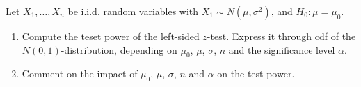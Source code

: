 
\begin{exercise}

Let $X_1, \dots, X_n$ be i.i.d. random variables with $X_1 \sim N(\mu, \sigma^2)$, and $H_0: \mu = \mu_0$.

\begin{enumerate}[label = (\alph*)]

    \item Compute the teset power of the left-sided $z$-test.
    Express it through cdf of the $N(0, 1)$-distribution, depending on $\mu_0$, $\mu$, $\sigma$, $n$ and the significance level $\alpha$.

    \item Comment on the impact of $\mu_0$, $\mu$, $\sigma$, $n$ and $\alpha$ on the test power.

\end{enumerate}

\end{exercise}


